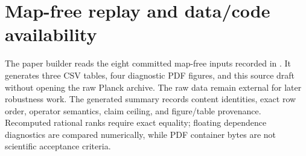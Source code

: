 \documentclass[11pt]{article}
\begin{document}
\section{Map-free replay and data/code availability}
The paper builder reads the eight committed map-free inputs recorded in . It generates three CSV tables, four diagnostic PDF figures, and this source draft without opening the raw Planck archive. The raw data remain external for later robustness work. The generated summary records content identities, exact row order, operator semantics, claim ceiling, and figure/table provenance. Recomputed rational ranks require exact equality; floating dependence diagnostics are compared numerically, while PDF container bytes are not scientific acceptance criteria.



\end{document}
